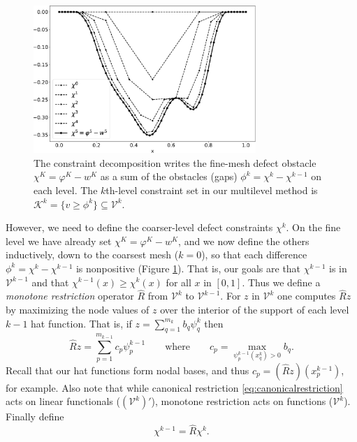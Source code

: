 \documentclass[letterpaper,final,12pt,reqno]{amsart}
\numberwithin{equation}{section}
\numberwithin{figure}{section}
\numberwithin{table}{section}
\begin{document}
\begin{figure}
\includegraphics[width=0.75\textwidth]{fixfigs/decomp_defect.pdf}
\caption{The constraint decomposition writes the fine-mesh defect obstacle $\chi^K = \varphi^K - w^K$ as a sum of the obstacles (gaps) $\phi^k = \chi^k - \chi^{k-1}$ on each level.  The $k$th-level constraint set in our multilevel method is $\mathcal{K}^k = \{v \ge \phi^k\} \subseteq \mathcal{V}^k$.}
\label{fig:gooddecomposition}
\end{figure}

However, we need to define the coarser-level defect constraints $\chi^k$.  On the fine level we have already set $\chi^K = \varphi^K - w^K$, and we now define the others inductively, down to the coarsest mesh ($k=0$), so that each difference $\phi^k = \chi^k - \chi^{k-1}$ is nonpositive (Figure \ref{fig:gooddecomposition}).  That is, our goals are that $\chi^{k-1}$ is in $\mathcal{V}^{k-1}$ and that $\chi^{k-1}(x) \ge \chi^k(x)$ for all $x$ in $[0,1]$.  Thus we define a \emph{monotone restriction} operator $\hat R$ from $\mathcal{V}^k$ to $\mathcal{V}^{k-1}$.  For $z$ in $\mathcal{V}^k$ one computes $\hat R z$ by maximizing the node values of $z$ over the interior of the support of each level $k-1$ hat function.  That is, if $z = \sum_{q=1}^{m_k} b_q \psi_q^k$ then
\begin{equation}
  \hat R z = \sum_{p=1}^{m_{k-1}} c_p \psi_p^{k-1} \qquad \text{where} \qquad c_p = \max_{\psi_p^{k-1}(x_q^k) > 0} b_q.  \label{eq:monotonerestriction}
\end{equation}
Recall that our hat functions form nodal bases, and thus $c_p = (\hat R z)(x_p^{k-1})$, for example.  Also note that while canonical restriction \eqref{eq:canonicalrestriction} acts on linear functionals ($(\mathcal{V}^k)'$), monotone restriction acts on functions ($\mathcal{V}^k$).  Finally define
\begin{equation}
  \chi^{k-1} = \hat R \chi^k.  \label{eq:chik}
\end{equation}
\end{document}
